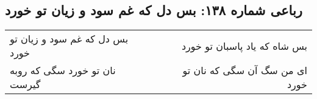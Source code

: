 \begin{center}
\section*{رباعی شماره ۱۳۸: بس دل که غم سود و زیان تو خورد}
\label{sec:sh138}
\begin{longtable}{l p{0.5cm} r}
بس دل که غم سود و زیان تو خورد
&&
بس شاه که یاد پاسبان تو خورد
\\
نان تو خورد سگی که روبه گیرست
&&
ای من سگ آن سگی که نان تو خورد
\\
\end{longtable}
\end{center}

